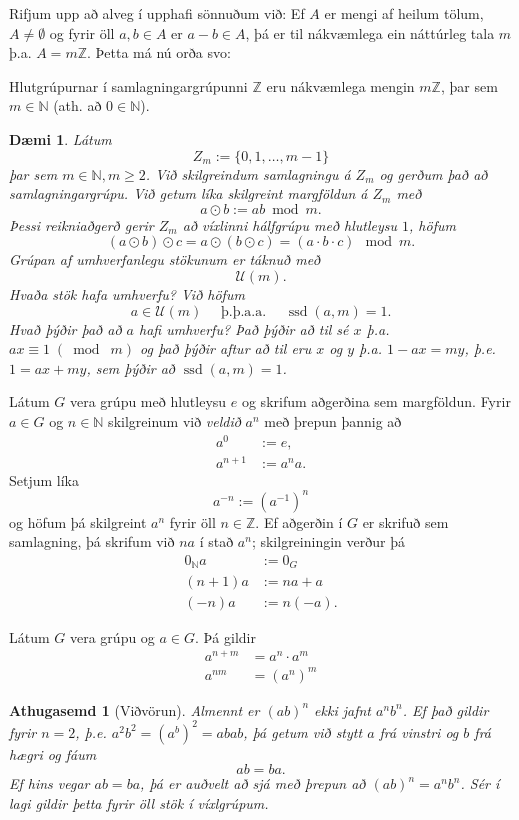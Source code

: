\documentclass[a4paper,icelandic,11pt]{book}
\theoremstyle{plain}
\newtheorem{daemi}{Dæmi}[chapter]
\newtheorem*{ath}{Athugasemd}
\newcommand{\N}{\mathbb{N}}
\newcommand{\Z}{\mathbb{Z}}
\DeclareMathOperator{\ssd}{ssd} %
\begin{document}
Rifjum upp að alveg í upphafi sönnuðum við: Ef $A$ er mengi af heilum tölum,
$A\neq \emptyset$ og fyrir öll $a,b\in A$ er $a-b\in A$, þá er til nákvæmlega
ein náttúrleg tala $m$ þ.a. $A=m\Z$. Þetta má nú orða svo:
\begin{setn}
  Hlutgrúpurnar í samlagningargrúpunni $\Z$ eru nákvæmlega mengin $m\Z$, þar
  sem $m\in \N$ (ath. að $0\in \N$).
\end{setn}
\begin{daemi}
  Látum \[ Z_m := \{ 0,1,\dots, m-1 \} \]
  þar sem $m\in \N, m\ge 2$. Við skilgreindum samlagningu á $Z_m$ og gerðum
  það að samlagningargrúpu. Við getum líka skilgreint margföldun á $Z_m$ með
  \[ a\odot b := ab\bmod m . \]
  Þessi reikniaðgerð gerir $Z_m$ að víxlinni hálfgrúpu með hlutleysu $1$,
  höfum
  \[ (a\odot b)\odot c = a\odot (b\odot c) = (a\cdot b \cdot c)\mod m. \]
  Grúpan af umhverfanlegu stökunum er táknuð með
  \[\mathcal U (m) . \]
  Hvaða stök hafa umhverfu? Við höfum
  \[ a\in \mathcal U(m) \quad \text{ þ.þ.a.a. } \quad \ssd(a,m) = 1 . \]
  Hvað þýðir það að $a$ hafi umhverfu? Það þýðir að til sé $x$ þ.a. $ax \equiv
  1\; (\bmod\; m)$ og það þýðir aftur að til eru $x$ og $y$ þ.a. $1-ax = my$,
  þ.e. $1 = ax + my$, sem þýðir að $\ssd(a,m) = 1$.
\end{daemi}
\begin{skilgr}
  Látum $G$ vera grúpu með hlutleysu $e$ og skrifum aðgerðina sem margföldun.
  Fyrir $a\in G$ og $n\in \N$ skilgreinum við \emph{veldið}
  $a^n$ með þrepun þannig að
  \begin{align*}
    a^0 &{:=} e,\\
    a^{n+1} &{:=} a^n a.
  \end{align*}
  Setjum líka
  \[ a^{-n} := (a^{-1})^n \]
  og höfum þá skilgreint $a^n$ fyrir öll $n\in \Z$. Ef aðgerðin í $G$ er
  skrifuð sem samlagning, þá skrifum við $na$ í stað $a^n$; skilgreiningin
  verður þá
  \begin{align*}
    0_\N a &{:=} 0_G \\
    (n+1) a &{:=} na + a \\
    (-n) a &{:=} n(-a).
  \end{align*}
\end{skilgr}
Látum $G$ vera grúpu og $a\in G$. Þá gildir 
  \begin{align*}
    a^{n+m} &= a^n\cdot a^m \\
    a^{nm} &= \left( a^n \right)^m
  \end{align*}
\begin{ath} [Viðvörun]
  Almennt er $\left( ab \right)^n$ \emph{ekki} jafnt $a^nb^n$. Ef það gildir
  fyrir $n=2$, þ.e. $a^2 b^2 = \left( a^b \right)^2 = abab$, þá getum við stytt
  $a$ frá vinstri og $b$ frá hægri og fáum \[
  ab = ba.
  \]
  Ef hins vegar $ab = ba$, þá er auðvelt að sjá með þrepun að $(ab)^n = a^nb^n$.
  Sér í lagi gildir þetta fyrir öll stök í víxlgrúpum.
\end{ath}
\end{document}
